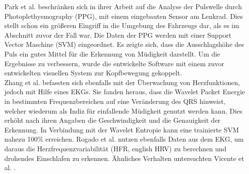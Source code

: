 {Park et al. \cite{Park:2009:DDD:1667780.1667798} beschränken sich in ihrer Arbeit auf die Analyse der Pulswelle durch Photoplethysmography (PPG), mit einem eingebauten Sensor am Lenkrad. Dies stellt schon ein größeren Eingriff in die Umgebung des Fahrzeugs dar, als es im Abschnitt zuvor der Fall war. Die Daten der PPG werden mit einer Support Vector Maschine (SVM) eingeordnet. Es zeigte sich, dass die Ausschlagshöhe des Puls ein gutes Mittel für die Erkennung von Müdigkeit darstellt. Um die Ergebnisse zu verbessern, wurde die entwickelte Software mit einem zuvor entwickelten visuellen System zur Kopfbewegung gekoppelt. \\

Zhang et al. \cite{zhang_6513058} befassten sich ebenfalls mit der Überwachung von Herzfunktionen, jedoch mit Hilfe eines EKGs. Sie fanden heraus, dass die Wavelet Packet Energie in bestimmten Frequenzbereichen auf eine Veränderung des QRS hinweist, welcher wiederum als Indiz für einfallende Müdigkeit genutzt werden kann. Dies erhöht nach ihren Angaben die Geschwindigkeit und die Genauigkeit der Erkennung. In Verbindung mit der Wavelet Entropie kann eine trainierte SVM nahezu 100\% erreichen. Rogado et al. \cite{Rogado_4913155} nutzen ebenfalls Daten aus dem EKG, um daraus die Herzfrequenzvariabilität (HFR, english HRV) zu berechnen und drohendes Einschlafen zu erkennen. Ähnliches Verhalten untersuchten Vicente et al. \cite{Vicente_6164509}. \\

}
